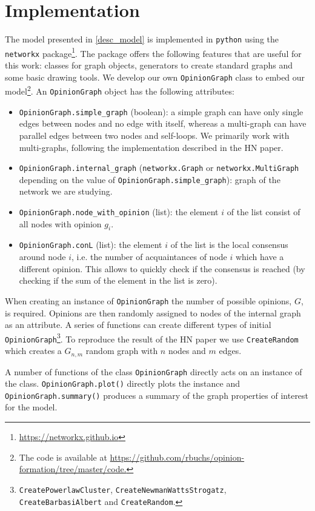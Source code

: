 \documentclass[11pt]{article}
\begin{document}
\section{Implementation}
\label{implementation}
The model presented in \autoref{desc_model} is implemented in \texttt{python} using the \texttt{networkx} package\footnote{\url{https://networkx.github.io}}. The package offers the following features that are useful for this work: classes for graph objects, generators to create standard graphs and some basic drawing tools. We develop our own \texttt{OpinionGraph} class to embed our model\footnote{The code is available at \url{https://github.com/rbuchs/opinion-formation/tree/master/code.}}. An \texttt{OpinionGraph} object has the following attributes:
\begin{itemize}
    \item \texttt{OpinionGraph.simple\_graph} (boolean): a simple graph can have only single edges between nodes and no edge with itself, whereas a multi-graph can have parallel edges between two nodes and self-loops. We primarily work with multi-graphs, following the implementation described in the HN paper.     
    \item \texttt{OpinionGraph.internal\_graph} (\texttt{networkx.Graph} or \texttt{networkx.MultiGraph} depending on the value of \texttt{OpinionGraph.simple\_graph}): graph of the network we are studying. 
    \item \texttt{OpinionGraph.node\_with\_opinion} (list): the element $i$ of the list consist of all nodes with opinion $g_i$. 
    \item \texttt{OpinionGraph.conL} (list): the element $i$ of the list is the local consensus around node $i$, i.e. the number of acquaintances of node $i$ which have a different opinion. This allows to quickly check if the consensus is reached (by checking if the sum of the element in the list is zero).
\end{itemize}
When creating an instance of \texttt{OpinionGraph} the number of possible opinions, $G$, is required. Opinions are then randomly assigned to nodes of the internal graph as an attribute. A series of functions can create different types of initial \texttt{OpinionGraph}\footnote{\texttt{CreatePowerlawCluster}, \texttt{CreateNewmanWattsStrogatz}, \texttt{CreateBarbasiAlbert} and \texttt{CreateRandom}.}. To reproduce the result of the HN paper we use \texttt{CreateRandom} which creates a $G_{n,m}$ random graph with $n$ nodes and $m$ edges.

A number of functions of the class \texttt{OpinionGraph} directly acts on an instance of the class. \texttt{OpinionGraph.plot()} directly plots the instance and \texttt{OpinionGraph.summary()} produces a summary of the graph properties of interest for the model. 
\end{document}
